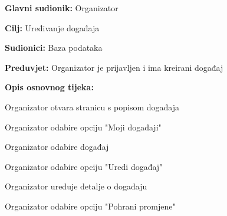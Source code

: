 					\noindent {}
					\begin{packed_item}
	
						\item \textbf{Glavni sudionik: }Organizator
						\item  \textbf{Cilj:} Uređivanje događaja
						\item  \textbf{Sudionici:} Baza podataka
						\item  \textbf{Preduvjet:} Organizator je prijavljen i ima kreirani događaj

						\item  \textbf{Opis osnovnog tijeka:}
						
						\item[] \begin{packed_enum}
	
							\item Organizator otvara stranicu s popisom događaja
							\item Organizator odabire opciju "Moji događaji"
							\item Organizator odabire događaj
							\item Organizator odabire opciju "Uredi događaj"
							\item Organizator uređuje detalje o događaju
							\item Organizator odabire opciju "Pohrani promjene"
						\end{packed_enum}
						
					\end{packed_item}

